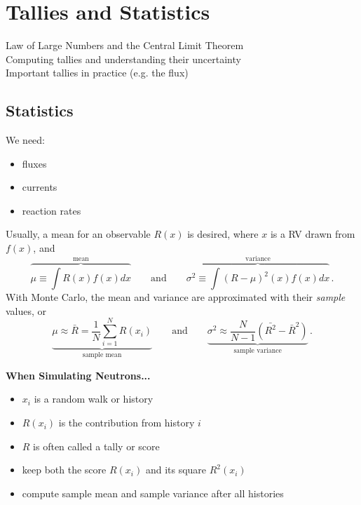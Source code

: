 \chapter{Tallies and Statistics}

Law of Large Numbers and the Central Limit Theorem \\
Computing \textcolor{mitred}{tallies} and understanding their uncertainty \\
Important tallies in practice (e.g. the flux)

\section*{Statistics}

We need:
\begin{itemize}
 \item fluxes
 \item currents
 \item reaction rates
\end{itemize}

Usually, a \textcolor{mitred}{mean} for an observable $R(x)$ is desired,
where $x$ is a RV drawn from $f(x)$, and
\begin{equation*}
 \overbrace{\mu \equiv \int R(x) f(x) dx}^{\text{mean}} \quad\quad \text{and} 
   \quad\quad 
 \overbrace{\sigma^2 \equiv \int (R-\mu)^2(x) f(x) dx}^{\text{variance}} \, .
\end{equation*}
With Monte Carlo, the mean and variance are approximated with 
their \emph{sample} values, or
\begin{equation*}
 \underbrace{\mu \approx \bar{R} = 
   \frac{1}{N} \sum^N_{i=1} R(x_i)}_{\text{sample mean}} 
   \quad\quad \text{and} \quad\quad 
 \underbrace{\sigma^2 \approx \frac{N}{N-1} 
   \left ( \bar{R^2} - \bar{R}^2 \right ) }_{\text{sample variance}} \, .
\end{equation*}

\textbf{When Simulating Neutrons...}
 \begin{itemize}
  \item $x_i$ is a \textcolor{mitred}{random walk} or \textcolor{mitred}{history}
  \item $R(x_i)$ is the contribution from history $i$
  \item $R$ is often called a \textcolor{mitred}{tally} or \textcolor{mitred}{score}
  \item keep both the score $R(x_i)$ and its square $R^2(x_i)$
  \item compute \textcolor{mitred}{sample mean} 
        and \textcolor{mitred}{sample variance} after all histories
 \end{itemize}
 
